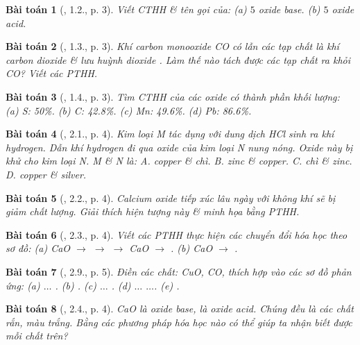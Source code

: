 \documentclass{article}
\newtheorem{baitoan}{Bài toán}
\begin{document}
\begin{baitoan}[\cite{SBT_Hoa_Hoc_9}, 1.2., p. 3]
	Viết CTHH \& tên gọi của: (a) $5$ oxide base. (b) $5$ oxide acid.
\end{baitoan}

\begin{baitoan}[\cite{SBT_Hoa_Hoc_9}, 1.3., p. 3]
	Khí carbon monooxide \emph{CO} có lẫn các tạp chất là khí carbon dioxide \emph{} \& lưu huỳnh dioxide \emph{}. Làm thế nào tách được các tạp chất ra khỏi \emph{CO}? Viết các PTHH.
\end{baitoan}

\begin{baitoan}[\cite{SBT_Hoa_Hoc_9}, 1.4., p. 3]
	Tìm CTHH của các oxide có thành phần khối lượng: (a) \emph{S: 50\%}. (b) \emph{C: 42.8\%}. (c) \emph{Mn: 49.6\%}. (d) \emph{Pb: 86.6\%}.
\end{baitoan}

\begin{baitoan}[\cite{SBT_Hoa_Hoc_9}, 2.1., p. 4]
	Kim loại M tác dụng với dung dịch \emph{HCl} sinh ra khí hydrogen. Dẫn khí hydrogen đi qua oxide của kim loại N nung nóng. Oxide này bị khử cho kim loại N. M \& N là: {\sf A.} copper \& chì. {\sf B.} zinc \& copper. {\sf C.} chì \& zinc. {\sf D.} copper \& silver.
\end{baitoan}

\begin{baitoan}[\cite{SBT_Hoa_Hoc_9}, 2.2., p. 4]
	Calcium oxide tiếp xúc lâu ngày với không khí sẽ bị giảm chất lượng. Giải thích hiện tượng này \& minh họa bằng PTHH.
\end{baitoan}

\begin{baitoan}[\cite{SBT_Hoa_Hoc_9}, 2.3., p. 4]
	Viết các PTHH thực hiện các chuyển đổi hóa học theo sơ đồ: (a) \emph{CaO $\to$  $\to$  $\to$ CaO $\to$ }. (b) \emph{CaO $\to$ }.
\end{baitoan}

\begin{baitoan}[\cite{SBT_Hoa_Hoc_9}, 2.9., p. 5]
	Điền các chất: \emph{CuO, CO, } thích hợp vào các sơ đồ phản ứng: (a) $\ldots$ \emph{}. (b) \emph{}. (c) $\ldots$ \emph{}. (d) $\ldots$ \emph{ $\ldots$}. (e) \emph{}.
\end{baitoan}

\begin{baitoan}[\cite{SBT_Hoa_Hoc_9}, 2.4., p. 4]
	\emph{CaO} là oxide base, \emph{} là oxide acid. Chúng đều là các chất rắn, màu trắng. Bằng các phương pháp hóa học nào có thể giúp ta nhận biết được mỗi chất trên?
\end{baitoan}
\end{document}
